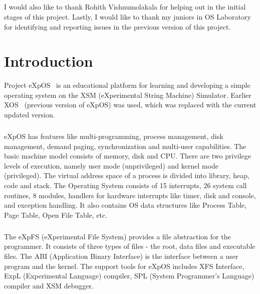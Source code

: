 \documentclass[12pt]{report}
\begin{document}
\begin{spacing}{1.01}
\paragraph{}
I would also like to thank Rohith Vishnumolakala for helping out in the initial stages of this project. Lastly, I would like to thank my juniors in OS Laboratory for identifying and reporting issues in the previous version of this project.
\vspace{4.0mm}

\tableofcontents
{}
\end{spacing}

\listoffigures
\listoftables
\vspace{-2 em}
\printglossary[nonumberlist]

\chapter{Introduction}
Project eXpOS~\cite{expos} is an educational platform for learning and developing a simple operating system on the XSM (eXperimental String Machine) Simulator. Earlier XOS~\cite{xos} (previous version of eXpOS) was used, which was replaced with the current updated version.

\paragraph{}
eXpOS has features like multi-programming, process management, disk management, demand paging, synchronization and multi-user capabilities. The basic machine model consists of memory, disk and CPU. There are two privilege levels of execution, namely user mode (unprivileged) and kernel mode (privileged). The virtual address space of a process is divided into library, heap, code and stack. The Operating System consists of 15 interrupts, 26 system call routines, 8 modules, handlers for hardware interrupts like timer, disk and console, and exception handling. It also contains OS data structures like Process Table, Page Table, Open File Table, etc.

\paragraph{}
The eXpFS (eXperimental File System) provides a file abstraction for the programmer. It consists of three types of files - the root, data files and executable files. The ABI (Application Binary Interface) is the interface between a user program and the kernel. The support tools for eXpOS includes XFS Interface, ExpL (Experimental Language) compiler,  SPL (System Programmer's Language) compiler and XSM debugger.
\end{document}
